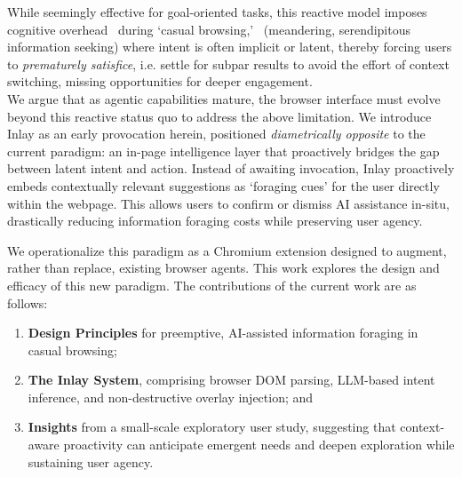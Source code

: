 \documentclass[sigconf]{acmart}
\begin{document}
While seemingly effective for goal-oriented tasks, this reactive model imposes cognitive overhead~\cite{ucs} during `casual browsing,'~\cite{casual, search} (meandering, serendipitous information seeking) where intent is often implicit or latent, thereby forcing users to \emph{prematurely satisfice}, i.e. settle for subpar results to avoid the effort of context switching, missing opportunities for deeper engagement.\\

We argue that as agentic capabilities mature, the browser interface must evolve beyond this reactive status quo to address the above limitation. We introduce Inlay as an early provocation herein, positioned \emph{diametrically opposite} to the current paradigm: an in-page intelligence layer that proactively bridges the gap between latent intent and action. Instead of awaiting invocation, Inlay proactively embeds contextually relevant suggestions as `foraging cues' for the user directly within the webpage. This allows users to confirm or dismiss AI assistance in-situ, drastically reducing information foraging costs while preserving user agency. 

We operationalize this paradigm as a Chromium extension designed to augment, rather than replace, existing browser agents. This work explores the design and efficacy of this new paradigm. The contributions of the current work are as follows: \\

\begin{enumerate}
    \item \textbf{Design Principles} for preemptive, AI-assisted information foraging in casual browsing;
    \item \textbf{The Inlay System}, comprising browser DOM parsing, LLM-based intent inference, and non-destructive overlay injection; and
    \item \textbf{Insights} from a small-scale exploratory user study, suggesting that context-aware proactivity can anticipate emergent needs and deepen exploration while sustaining user agency.
\end{enumerate}
\newpage
\end{document}
